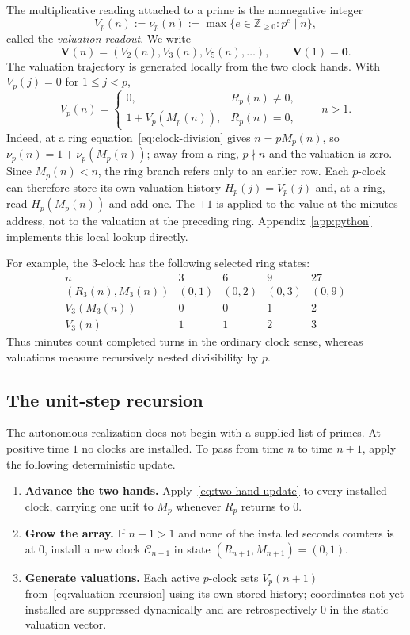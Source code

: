 \documentclass[11pt,a4paper]{article}
\theoremstyle{clockplain}
\theoremstyle{definition}
\theoremstyle{remark}
\newcommand{\V}{\mathbf V}
\begin{document}
The multiplicative reading attached to a prime is the nonnegative integer
\begin{equation}
V_p(n):=\nu_p(n):=\max\{e\in\mathbb Z_{\ge0}:p^e\mid n\},
\label{eq:valuation-readout}
\end{equation}
called the \emph{valuation readout}. We write
\[
\V(n)=(V_2(n),V_3(n),V_5(n),\ldots),
\qquad \V(1)=\mathbf0.
\]
The valuation trajectory is generated locally from the two clock hands. With $V_p(j)=0$ for $1\le j<p$,
\begin{equation}
V_p(n)=
\begin{cases}
0, & R_p(n)\ne0,\\[1mm]
1+V_p(M_p(n)), & R_p(n)=0,
\end{cases}
\qquad n>1.
\label{eq:valuation-recursion}
\end{equation}
Indeed, at a ring equation~\eqref{eq:clock-division} gives $n=pM_p(n)$, so $\nu_p(n)=1+\nu_p(M_p(n))$; away from a ring, $p\nmid n$ and the valuation is zero. Since $M_p(n)<n$, the ring branch refers only to an earlier row. Each $p$-clock can therefore store its own valuation history $H_p(j)=V_p(j)$ and, at a ring, read $H_p(M_p(n))$ and add one. The $+1$ is applied to the value at the minutes address, not to the valuation at the preceding ring. Appendix~\ref{app:python} implements this local lookup directly.

For example, the $3$-clock has the following selected ring states:
\[
\begin{array}{c|cccc}
n&3&6&9&27\\ \hline
(R_3(n),M_3(n))&(0,1)&(0,2)&(0,3)&(0,9)\\
V_3(M_3(n))&0&0&1&2\\
V_3(n)&1&1&2&3
\end{array}
\]
Thus minutes count completed turns in the ordinary clock sense, whereas valuations measure recursively nested divisibility by $p$.

\subsection{The unit-step recursion}
\label{sec:recursive-primes}

The autonomous realization does not begin with a supplied list of primes. At positive time $1$ no clocks are installed. To pass from time $n$ to time $n+1$, apply the following deterministic update.

\begin{enumerate}[label=\arabic*.,leftmargin=8mm]
\item \textbf{Advance the two hands.} Apply~\eqref{eq:two-hand-update} to every installed clock, carrying one unit to $M_p$ whenever $R_p$ returns to $0$.
\item \textbf{Grow the array.} If $n+1>1$ and none of the installed seconds counters is at $0$, install a new clock $\mathcal C_{n+1}$ in state $(R_{n+1},M_{n+1})=(0,1)$.
\item \textbf{Generate valuations.} Each active $p$-clock sets $V_p(n+1)$ from~\eqref{eq:valuation-recursion} using its own stored history; coordinates not yet installed are suppressed dynamically and are retrospectively $0$ in the static valuation vector.
\end{enumerate}
\end{document}
